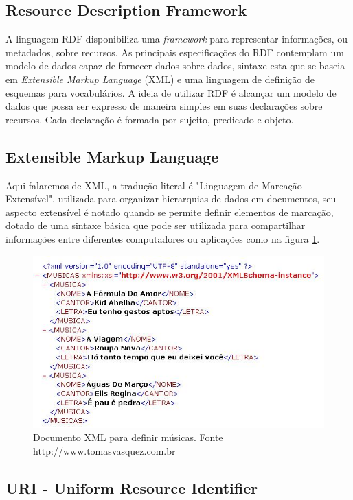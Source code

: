 \subsection{Resource Description Framework}
A linguagem RDF disponibiliza uma \textit{framework} para representar informações, ou metadados, sobre recursos. As principais especificações do RDF contemplam um modelo de dados capaz de fornecer dados sobre dados, sintaxe esta que se baseia em \textit{Extensible Markup Language} (XML) e uma linguagem de definição de esquemas para vocabulários. A ideia de utilizar RDF é alcançar um modelo de dados que possa ser expresso de maneira simples em suas declarações sobre recursos. Cada declaração é formada por sujeito, predicado e objeto\cite{breitman:2006}.

\subsection{Extensible Markup Language}
Aqui falaremos de XML, a tradução literal é "Linguagem de Marcação Extensível", utilizada para organizar hierarquias de dados em documentos, seu aspecto extensível é notado quando se permite definir elementos de marcação, dotado de uma sintaxe básica que pode ser utilizada para compartilhar informações entre diferentes computadores ou aplicações\cite{breitman:2006} como na figura \ref{fig01}.

\begin{figure}[h]
	\centering
	\includegraphics[keepaspectratio=true,scale=1.0]{figuras/exemploXML.jpg}
	\caption{Documento XML para definir músicas. Fonte http://www.tomasvasquez.com.br}
	\label{fig01}
\end{figure}

\subsection{URI - Uniform Resource Identifier}

